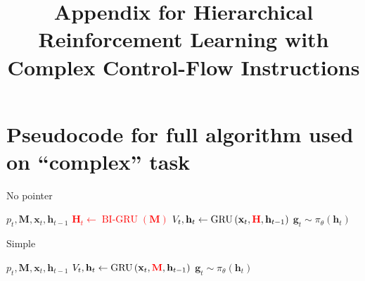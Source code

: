 \documentclass{article}
\title{Appendix for Hierarchical Reinforcement Learning with Complex Control-Flow
Instructions}
\DeclareMathOperator{\GRU}{GRU}
\DeclareMathOperator{\BIGRU}{BI-GRU}
\begin{document}
\date{}
\author{}
\maketitle
\section{Pseudocode for full algorithm used on ``complex'' task}
\label{full-algorithm}

\begin{algorithm}[H]
  \caption{No pointer}
  \begin{algorithmic}[1]
     $p_t, \mathbf{M} , \mathbf{x}_t, \mathbf{h}_{t-1}$
    \textcolor{red}{\STATE ${\mathbf{H}_t} \gets \BIGRU\left(\mathbf{M}\right)$}
    \STATE $V_t, \mathbf{h}_t  \gets \GRU\left(\mathbf{x}_t,
    \textcolor{red}{\mathbf{H}}, \mathbf{h}_{t-1}\right)$
    \STATE $\mathbf{g}_{t} \sim \pi_\theta\left(\mathbf{h}_t\right)$
  \end{algorithmic}
\end{algorithm}

\begin{algorithm}[H]
  \caption{Simple}
  \begin{algorithmic}[1]
     $p_t, \mathbf{M} , \mathbf{x}_t, \mathbf{h}_{t-1}$
    \STATE $V_t, \mathbf{h}_t  \gets \GRU\left(\mathbf{x}_t,
    \textcolor{red}{\mathbf{M}}, \mathbf{h}_{t-1}\right)$
    \STATE $\mathbf{g}_{t} \sim \pi_\theta\left(\mathbf{h}_t\right)$
  \end{algorithmic}
\end{algorithm}
\end{document}

